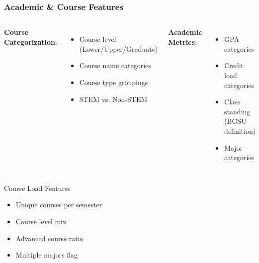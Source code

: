 \documentclass{beamer}
\begin{document}
\begin{frame}
\frametitle{Academic \& Course Features}
    \begin{columns}
        \textbf{Course Categorization}:
            \begin{itemize}
            \item Course level (Lower/Upper/Graduate)
            \item Course name categories
            \item Course type groupings
            \item STEM vs. Non-STEM
            \end{itemize}
            
        \textbf{Academic Metrics}:
            \begin{itemize}
            \item GPA categories
            \item Credit load categories
            \item Class standing (BGSU definition)
            \item Major categories
            \end{itemize}
    \end{columns}

    \begin{block}{Course Load Features}
        \begin{itemize}
        \item Unique courses per semester
        \item Course level mix
        \item Advanced course ratio
        \item Multiple majors flag
        \end{itemize}
    \end{block}
\end{frame}
\end{document}
